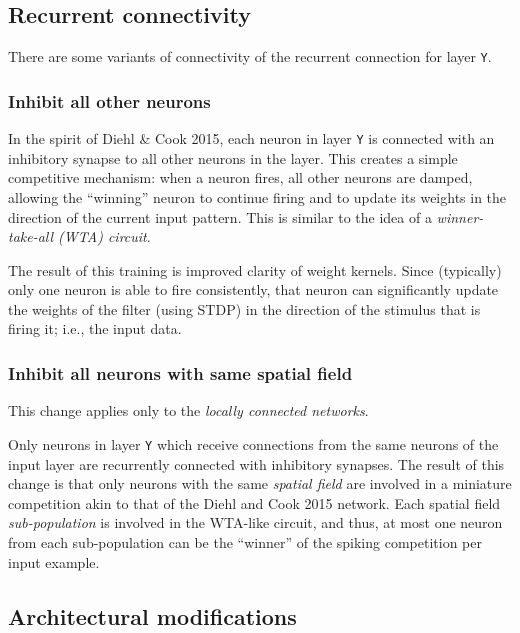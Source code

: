 \documentclass{article}
\begin{document}
\subsection{Recurrent connectivity}
\label{ss:recurrent connectivity}

There are some variants of connectivity of the recurrent connection for layer \texttt{Y}.

\subsubsection{Inhibit all other neurons}

In the spirit of Diehl \& Cook 2015, each neuron in layer \texttt{Y} is connected with an inhibitory synapse to all other neurons in the layer. This creates a simple competitive mechanism: when a neuron fires, all other neurons are damped, allowing the ``winning'' neuron to continue firing and to update its weights in the direction of the current input pattern. This is similar to the idea of a \textit{winner-take-all (WTA) circuit}.

The result of this training is improved clarity of weight kernels. Since (typically) only one neuron is able to fire consistently, that neuron can significantly update the weights of the filter (using STDP) in the direction of the stimulus that is firing it; i.e., the input data.

\subsubsection{Inhibit all neurons with same spatial field}

This change applies only to the \textit{locally connected networks}.

Only neurons in layer \texttt{Y} which receive connections from the same neurons of the input layer are recurrently connected with inhibitory synapses. The result of this change is that only neurons with the same \textit{spatial field} are involved in a miniature competition akin to that of the Diehl and Cook 2015 network. Each spatial field \textit{sub-population} is involved in the WTA-like circuit, and thus, at most one neuron from each sub-population can be the ``winner'' of the spiking competition per input example.

\subsection{Architectural modifications}
\end{document}
